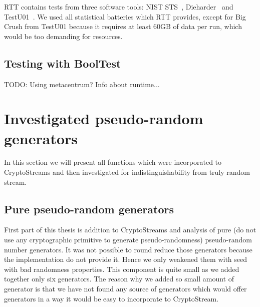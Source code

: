 \documentclass[
    digital,    %
    oneside,    %
    color,
    11pt,
    nocover,
    notable,
    nolof,
    nolot,
    final
]{fithesis3}
\begin{document}
RTT contains tests from three software tools: {NIST STS}~\cite{nist-sts}, Dieharder~\cite{dieharder} and TestU01~\cite{l2007testu01}. We used all statistical batteries which RTT provides, except for Big Crush from TestU01 because it requires at least 60GB of data per run, which would be too demanding for resources. 

\subsection{Testing with BoolTest}

TODO: Using metacentrum? Info about runtime...

\section{Investigated pseudo-random generators}

In this section we will present all functions which were incorporated to CryptoStreams and then investigated for indistinguishability from truly random stream.

\subsection{Pure pseudo-random generators}

First part of this thesis is addition to CryptoStreams and analysis of pure (do not use any cryptographic primitive to generate pseudo-randomness) pseudo-random number generators. It was not possible to round reduce those generators because the implementation do not provide it. Hence we only weakened them with seed with bad randomness properties. This component is quite small as we added together only six generators. The reason why we added so small amount of generator is that we have not found any source of generators which would offer generators in a way it would be easy to incorporate to CryptoStream.
\end{document}
